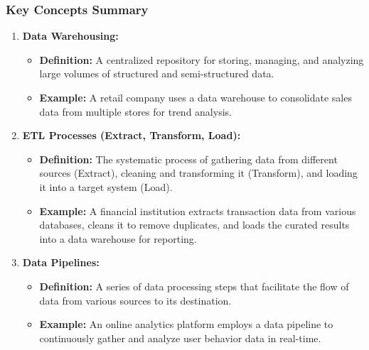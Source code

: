 \documentclass{beamer}
\begin{document}
\begin{frame}[fragile]
    \frametitle{Key Concepts Summary}

    \begin{enumerate}
        \item \textbf{Data Warehousing:}  
              \begin{itemize}
                  \item \textbf{Definition:} A centralized repository for storing, managing, and analyzing large volumes of structured and semi-structured data.
                  \item \textbf{Example:} A retail company uses a data warehouse to consolidate sales data from multiple stores for trend analysis.
              \end{itemize}
              
        \item \textbf{ETL Processes (Extract, Transform, Load):}  
              \begin{itemize}
                  \item \textbf{Definition:} The systematic process of gathering data from different sources (Extract), cleaning and transforming it (Transform), and loading it into a target system (Load).
                  \item \textbf{Example:} A financial institution extracts transaction data from various databases, cleans it to remove duplicates, and loads the curated results into a data warehouse for reporting.
              \end{itemize}

        \item \textbf{Data Pipelines:}  
              \begin{itemize}
                  \item \textbf{Definition:} A series of data processing steps that facilitate the flow of data from various sources to its destination.
                  \item \textbf{Example:} An online analytics platform employs a data pipeline to continuously gather and analyze user behavior data in real-time.
              \end{itemize}
    \end{enumerate}
\end{frame}
\end{document}
